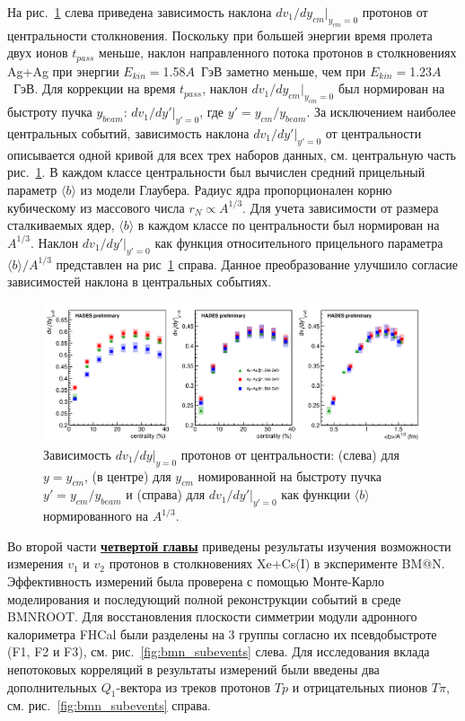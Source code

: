 На рис.~\ref{fig:hades_dv1dy_many_plot} слева приведена зависимость наклона $dv_1/dy_{cm}|_{y_{cm}=0}$ протонов от центральности столкновения.
Поскольку при большей энергии время пролета двух ионов $t_{pass}$ меньше, наклон направленного потока протонов в столкновениях Ag+Ag при энергии $E_{kin}=$1.58$A$~ГэВ заметно меньше, чем при $E_{kin}=$1.23$A$~ГэВ. 
Для коррекции на время $t_{pass}$, наклон  $dv_1/dy_{cm}|_{y_{cm}=0}$ был нормирован на быстроту пучка $y_{beam}$: $dv_1/dy'|_{y'=0}$, где $y'=y_{cm}/y_{beam}$.
За исключением наиболее центральных событий, зависимость наклона $dv_1/dy'|_{y'=0}$ от центральности описывается одной кривой для всех трех наборов данных, см. центральную часть рис.~\ref{fig:hades_dv1dy_many_plot}.
В каждом классе центральности был вычислен средний прицельный параметр $\langle b \rangle$ из модели Глаубера.
Радиус ядра пропорционален корню кубическому из массового числа $r_N \propto A^{1/3}$.
Для учета зависимости от размера сталкиваемых ядер,  $\langle b \rangle$ в каждом классе по центральности был нормирован на $A^{1/3}$.
Наклон $dv_1/dy'|_{y'=0}$ как функция относительного прицельного параметра $\langle b \rangle / A^{1/3}$ представлен на рис~\ref{fig:hades_dv1dy_many_plot} справа.
Данное преобразование улучшило согласие зависимостей наклона в центральных событиях. 
%
\begin{figure}[h]
\begin{center}
\includegraphics[width=0.9\linewidth]{images/dv1dy_many_plot.png}
\caption{Зависимость $dv_1/dy|_{y=0}$ протонов от центральности: (слева) для $y=y_{cm}$, (в центре) для $y_{cm}$ номированной 
на быстроту пучка $y' = y_{cm}/y_{beam}$ и (справа) для $dv_1/dy'|_{y'=0}$ как функции $\langle b \rangle$ нормированного на  $A^{1/3}$.}
\label{fig:hades_dv1dy_many_plot}
\end{center}
\end{figure}


Во второй части \underline{\textbf{четвертой главы}} приведены результаты изучения возможности измерения $v_1$ и $v_2$ протонов в столкновениях Xe+Cs(I)   в эксперименте  BM@N.
Эффективность  измерений была проверена  с помощью Монте-Карло моделирования   и последующий полной реконструкции событий в среде BMNROOT. 
Для восстановления плоскости симметрии модули адронного калориметра FHCal были разделены на 3 группы согласно их псевдобыстроте (F1, F2 и F3), см. рис.~\ref{fig:bmn_subevents} слева. 
Для исследования вклада непотоковых корреляций в результаты измерений были введены два дополнительных  $Q_1$-вектора из треков протонов $Tp$ и отрицательных пионов $T\pi$, см.  рис.~\ref{fig:bmn_subevents} справа.

